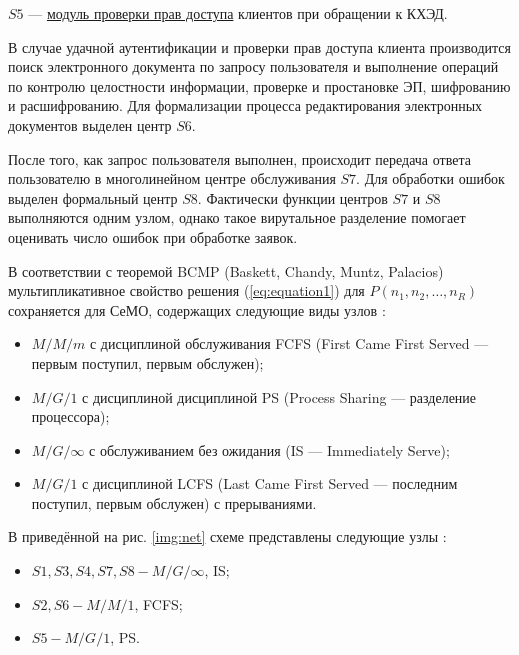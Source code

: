 \vspace{\baselineskip}
$S5$ --- \underline{модуль проверки прав доступа} клиентов при обращении к КХЭД.

\vspace{\baselineskip}
В случае удачной аутентификации и проверки прав доступа клиента производится поиск электронного документа по запросу пользователя и выполнение операций по контролю целостности информации, проверке и простановке ЭП, шифрованию и расшифрованию. Для формализации процесса редактирования электронных документов выделен центр $S6$.

После того, как запрос пользователя выполнен, происходит передача ответа пользователю в многолинейном центре обслуживания $S7$.
Для обработки ошибок выделен формальный центр $S8$. Фактически функции центров $S7$ и $S8$ выполняются одним узлом, однако такое вирутальное разделение помогает оценивать число ошибок при обработке заявок.

\vspace{\baselineskip}
В соответствии с теоремой BCMP (Baskett, Chandy, Muntz, Palacios) мультипликативное свойство решения (\ref{eq:equation1}) для $P(n_1,n_2,\ldots,n_R)$ сохраняется для СеМО, содержащих следующие виды узлов \cite{vishnevsky}:
\begin{itemize}
  \item $M/M/m$ с дисциплиной обслуживания FCFS (First Came First Served --- первым поступил, первым обслужен);
  \item $M/G/1$ с дисциплиной дисциплиной PS (Process Sharing --- разделение процессора);
  \item $M/G/\infty$ с обслуживанием без ожидания (IS --- Immediately Serve);
  \item $M/G/1$ с дисциплиной LCFS (Last Came First Served --- последним поступил, первым обслужен) с прерываниями.
\end{itemize}

В приведённой на рис. \ref{img:net} схеме представлены следующие узлы \cite{bykov}:
\begin{itemize}
  \item $S1, S3, S4, S7, S8 - M/G/\infty$, IS;
  \item $S2, S6 - M/M/1$, FCFS;
  \item $S5 - M/G/1$, PS.
\end{itemize}


